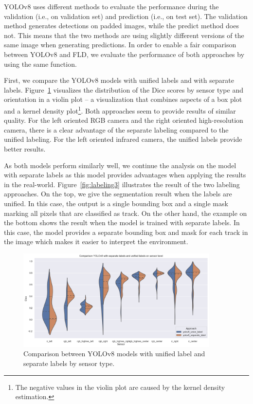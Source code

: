 \documentclass[Master,MDS,english]{BASE/twbook} %
\begin{document}
YOLOv8 uses different methods to evaluate the performance during the validation (i.e., on validation set) and prediction (i.e., on test set). The validation method generates detections on padded images, while the predict method does not. This means that the two methods are using slightly different versions of the same image when generating predictions. In order to enable a fair comparison between YOLOv8 and FLD, we evaluate the performance of both approaches by using the same function.

First, we compare the YOLOv8 models with unified labels and with separate labels. Figure~\ref{fig:yolo_vs_yolo} visualizes the distribution of the Dice scores by sensor type and orientation in a violin plot -- a visualization that combines aspects of a box plot and a kernel density plot\footnote{The negative values in the violin plot are caused by the kernel density estimation.}. 
Both approaches seem to provide results of similar quality. 
For the left oriented RGB camera and the right oriented high-resolution camera, there is a clear advantage of the separate labeling compared to the unified labeling. For the left oriented infrared camera, the unified labels provide better results.

As both models perform similarly well, we continue the analysis on the model with separate labels as this model provides advantages when applying the results in the real-world. 
Figure~\ref{fig:labeling3} illustrates the result of the two labeling approaches. 
On the top, we give the segmentation result when the labels are unified. In this case, the output is a single bounding box and a single mask marking all pixels that are classified as track. On the other hand, the example on the bottom shows the result when the model is trained with separate labels. In this case, the model provides a separate bounding box and mask for each track in the image which makes it easier to interpret the environment.

 

\begin{figure}[h]
\centering
\includegraphics[width=0.9\textwidth]{images/results/violin_plot_yolo}
\caption{Comparison between YOLOv8 models with unified label and separate labels by sensor type. }
\label{fig:yolo_vs_yolo}
\end{figure}
\end{document}
